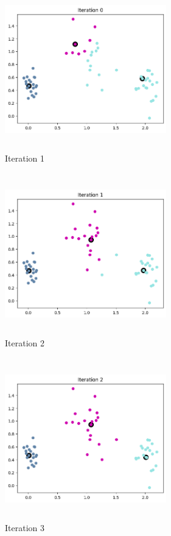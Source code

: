 \documentclass[10pt]{article}
\begin{document}
\begin{figure}[H]
  \centering
  \includegraphics[width=7cm, height=7cm]{images/4.2e_1.png}
  \caption{Iteration 1}
  \label{fig:Clusters}
\end{figure}

\begin{figure}[H]
  \centering
  \includegraphics[width=7cm, height=7cm]{images/4.2e_2.png}
  \caption{Iteration 2}
  \label{fig:Clusters}
\end{figure}

\begin{figure}[H]
  \centering
  \includegraphics[width=7cm, height=7cm]{images/4.2e_3.png}
  \caption{Iteration 3}
  \label{fig:Clusters}
\end{figure}
\end{document}
